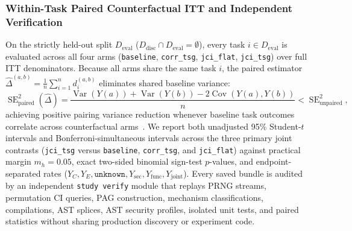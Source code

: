 \subsubsection{Within-Task Paired Counterfactual ITT and Independent Verification}
On the strictly held-out split $D_{\mathrm{eval}}$ ($D_{\mathrm{disc}} \cap
D_{\mathrm{eval}} = \emptyset$), every task $i \in D_{\mathrm{eval}}$ is
evaluated across all four arms (\texttt{baseline}, \texttt{corr\_tsg},
\texttt{jci\_flat}, \texttt{jci\_tsg}) over full ITT denominators. Because all
arms share the same task $i$, the paired estimator $\hat{\Delta}^{(a,b)} =
\frac{1}{n}\sum_{i=1}^n d_i^{(a,b)}$ eliminates shared baseline variance:
\begin{equation}
  \operatorname{SE}_{\mathrm{paired}}^2(\hat{\Delta})
  = \frac{\operatorname{Var}(Y(a)) + \operatorname{Var}(Y(b))
    - 2\operatorname{Cov}(Y(a), Y(b))}{n}
  < \operatorname{SE}_{\mathrm{unpaired}}^2,
  \label{eq:paired-se}
\end{equation}
achieving positive pairing variance reduction whenever baseline task outcomes
correlate across counterfactual arms~\cite{egami2022texts}. We report both
unadjusted 95\% Student-$t$ intervals and Bonferroni-simultaneous intervals
across the three primary joint contrasts (\texttt{jci\_tsg} versus
\texttt{baseline}, \texttt{corr\_tsg}, and \texttt{jci\_flat}) against
practical margin $m_h = 0.05$, exact two-sided binomial sign-test $p$-values,
and endpoint-separated rates ($Y_C, Y_E, \texttt{unknown}, Y_{\mathrm{sec}},
Y_{\mathrm{func}}, Y_{\mathrm{joint}}$). Every saved bundle is audited by an
independent \texttt{study verify} module that replays PRNG streams, permutation CI
queries, PAG construction, mechanism classifications, \prompttsg compilations,
AST splices, AST security profiles, isolated unit tests, and paired statistics
without sharing production discovery or experiment code.
